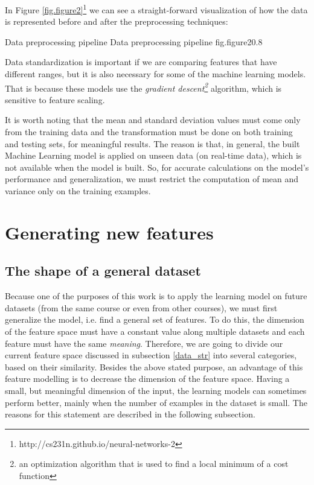 In Figure \ref{fig.figure2}\footnote{http://cs231n.github.io/neural-networks-2} we can 
see a straight-forward visualization of how the data is represented before and after 
the preprocessing techniques:

%
    {Data preprocessing pipeline}%
    {Data preprocessing pipeline}%
    {fig.figure2}{0.8}

Data standardization is important if we are comparing features that have different 
ranges, but it is also necessary for some of the machine learning models. That is 
because these models use the {\it gradient descent\footnote{an optimization algorithm
that is used to find a local minimum of a cost function}} algorithm, which is 
sensitive to feature scaling.

It is worth noting that the mean and standard deviation values must come only 
from the training data and the transformation must be done on both training and 
testing sets, for meaningful results. The reason is that, in general, the built 
Machine Learning model is applied on unseen data (on real-time data), which is 
not available when the model is built. So, for accurate calculations on the 
model's performance and generalization, we must restrict the computation of 
mean and variance only on the training examples.

\section{Generating new features}

\subsection{The shape of a general dataset}
\label{dataset_gen}

Because one of the purposes of this work is to apply the learning model 
on future datasets (from the same course or even from other courses), 
we must first generalize the model, i.e. find a general set of features. To do this, 
the dimension of the feature space must have a constant value along multiple datasets 
and each feature must have the same {\it meaning}. Therefore, we are going 
to divide our current feature space discussed in subsection \ref{data_str} 
into several categories, based on their similarity. Besides the above stated 
purpose, an advantage of this feature modelling is to decrease the dimension 
of the feature space. Having a small, but meaningful dimension of the input, 
the learning models can sometimes perform better, mainly when the number of 
examples in the dataset is small. The reasons for this statement are described 
in the following subsection. 

